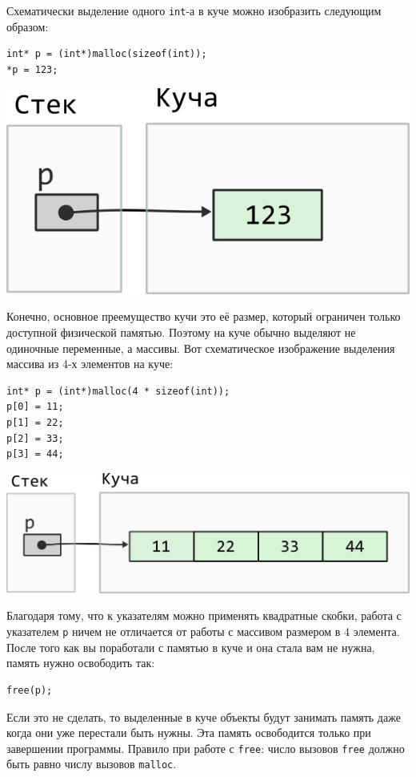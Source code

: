 \documentclass{article}
\begin{document}
Схематически выделение одного \texttt{int}-а в куче можно изобразить следующим образом:
 
\begin{multicols}{2}
\begin{lstlisting}
int* p = (int*)malloc(sizeof(int));
*p = 123;
\end{lstlisting}
\vfill
\columnbreak
\begin{center}
\includegraphics[scale=0.72]{../images/malloc_class_tasks/heap_int.png}
\end{center}
\end{multicols}

Конечно, основное преемущество кучи это её размер, который ограничен только доступной физической памятью. Поэтому на куче обычно выделяют не одиночные переменные, а массивы. Вот схематическое изображение выделения массива из 4-х элементов на куче:
\begin{multicols}{2}
\begin{lstlisting}
int* p = (int*)malloc(4 * sizeof(int));
p[0] = 11;
p[1] = 22;
p[2] = 33;
p[3] = 44;
\end{lstlisting}
\vfill
\columnbreak
\begin{center}
\includegraphics[scale=0.72]{../images/malloc_class_tasks/heap_int_array.png}
\end{center}
\end{multicols}
Благодаря тому, что к указателям можно применять квадратные скобки, работа с указателем \texttt{p} ничем не отличается от работы с массивом размером в 4 элемента.\\
После того как вы поработали с памятью в куче и она стала вам не нужна, память нужно освободить так:
\begin{lstlisting}
free(p);
\end{lstlisting}
Если это не сделать, то выделенные в куче объекты будут занимать память даже когда они уже перестали быть нужны. Эта память освободится только при завершении программы. Правило при работе с \texttt{free}: число вызовов \texttt{free} должно быть равно числу вызовов \texttt{malloc}.
\end{document}
